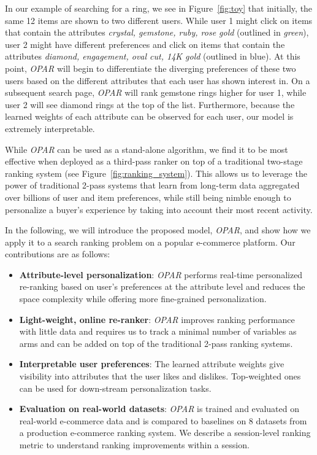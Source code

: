 \documentclass[11pt, dvipdfmx]{article}
\begin{document}
In our example of searching for a ring, we see in Figure~\ref{fig:toy} that initially, the same 12 items are shown to two different users. While user 1 might click on items that contain the attributes \emph{crystal, gemstone, ruby,  rose gold} (outlined in \emph{green}), user 2 might have different preferences and click on items that contain the attributes \emph{diamond, engagement, oval cut, 14K gold} (outlined in blue).  At this point, \emph{OPAR} will begin to differentiate the diverging preferences of these two users based on the different attributes that each user has shown interest in. On a subsequent search page, \emph{OPAR} will rank gemstone rings higher for user 1, while user 2 will see diamond rings at the top of the list.  
Furthermore, because the learned weights of each attribute can be observed for each user, our model is extremely interpretable. 

While \emph{OPAR} can be used as a stand-alone algorithm, we find it to be most effective when deployed as a third-pass ranker on top of a traditional two-stage ranking system (see Figure~\ref{fig:ranking_system}). This allows us to leverage the power of traditional 2-pass systems that learn from long-term data aggregated over billions of user and item preferences, while still being nimble enough to personalize a buyer's experience by taking into account their most recent activity. 

In the following, we will introduce the proposed model, \emph{OPAR}, and show how we apply it to a search ranking problem on a popular e-commerce platform. Our contributions are as follows:
\begin{itemize}
    \item \textbf{Attribute-level personalization}: \emph{OPAR} performs real-time personalized re-ranking based on user's preferences at the attribute level and reduces the space complexity while offering more fine-grained personalization. 
    \item \textbf{Light-weight, online re-ranker}: \emph{OPAR} improves ranking performance with little data and requires us to track a minimal number of variables as arms and can be added on top of the traditional 2-pass ranking systems.
    \item \textbf{Interpretable user preferences}: The learned attribute weights give visibility into attributes that the user likes and dislikes. Top-weighted ones can be used for down-stream personalization tasks.
   \item \textbf{Evaluation on real-world datasets}: \emph{OPAR} is trained and evaluated on real-world e-commerce data and is compared to baselines on 8 datasets from a production e-commerce ranking system. We describe a session-level ranking metric to understand ranking improvements within a session.
\end{itemize}
\end{document}
